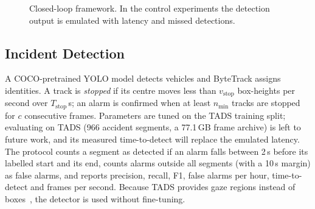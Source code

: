 \documentclass[conference]{IEEEtran}
\begin{document}
\begin{figure}[!htbp]
\centering
{}
\caption{Closed-loop framework. In the control experiments the detection output is emulated with latency and missed detections.}
\label{fig:framework}
\end{figure}

\subsection{Incident Detection}
A COCO-pretrained YOLO model detects vehicles and ByteTrack assigns identities. A track is \emph{stopped} if its centre moves less than $v_{\text{stop}}$ box-heights per second over $T_{\text{stop}}$\,s; an alarm is confirmed when at least $n_{\min}$ tracks are stopped for $c$ consecutive frames. Parameters are tuned on the TADS training split; evaluating on TADS (966 accident segments, a 77.1\,GB frame archive) is left to future work, and its measured time-to-detect will replace the emulated latency. The protocol counts a segment as detected if an alarm falls between 2\,s before its labelled start and its end, counts alarms outside all segments (with a 10\,s margin) as false alarms, and reports precision, recall, F1, false alarms per hour, time-to-detect and frames per second. Because TADS provides gaze regions instead of boxes~\cite{xu2025sttad}, the detector is used without fine-tuning.
\end{document}
